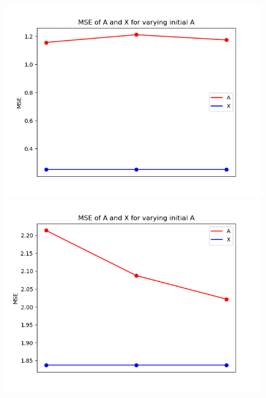 \begin{figure}[H]
\begin{minipage}[t]{.45\textwidth}
    \end{minipage}
    \begin{minipage}[t]{.45\textwidth}
        \centering
		\includegraphics[scale=0.5]{figures/chapter6/Mix_Error_initial_A_m8_k16_L1000_RealA.png}
    \end{minipage} 
    \hfill
    \begin{minipage}[t]{.45\textwidth}
        \centering
		\includegraphics[scale=0.5]{figures/chapter6/AR_Error_initial_A_m8_k16_L1000_RealA.png}
    \end{minipage}
\caption{}
\label{fig:initialA}
\end{figure}
